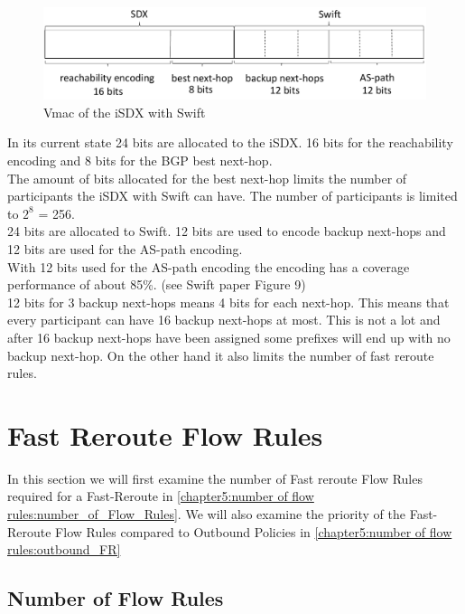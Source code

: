 \begin{figure}[h]
\center
\includegraphics[scale = 0.65]{Figures/eval_vmac_cropped2.pdf}
\caption{Vmac of the iSDX with Swift}
\end{figure}

In its current state 24 bits are allocated to the iSDX. 16 bits for the reachability encoding and 8 bits for the BGP best next-hop. \\
The amount of bits allocated for the best next-hop limits the number of participants the iSDX with Swift can have. The number of participants is limited to $2^8$ = 256. \\
24 bits are allocated to Swift. 12 bits are used to encode backup next-hops and 12 bits are used for the AS-path encoding. \\
With 12 bits used for the AS-path encoding the encoding has a coverage performance of about 85\%. (see Swift paper Figure 9)\\
12 bits for 3 backup next-hops means 4 bits for each next-hop. This means that every participant can have 16 backup next-hops at most. This is not a lot and after 16 backup next-hops have been assigned some prefixes will end up with no backup next-hop. On the other hand it also limits the number of fast reroute rules. \\


\section{\label{chapter5:number of flow rules}Fast Reroute Flow Rules}

In this section we will first examine the number of Fast reroute Flow Rules required for a Fast-Reroute in \ref{chapter5:number of flow rules:number_of_Flow_Rules}. We will also examine the priority of the Fast-Reroute Flow Rules compared to Outbound Policies in \ref{chapter5:number of flow rules:outbound_FR}

\subsection{\label{chapter5:number of flow rules:number_of_Flow_Rules}Number of Flow Rules}

